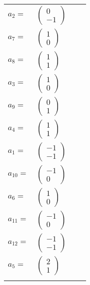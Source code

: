 \documentclass[1p]{elsarticle_modified}
\theoremstyle{definition}
\begin{document}
\begin{tabular}{m{7pt} m{180pt} m{7pt} m{180pt} }
\flushright $a_{2}=$&$\begin{pmatrix}0\\-1\end{pmatrix}$ \\
\flushright $a_{7}=$&$\begin{pmatrix}1\\0\end{pmatrix}$ \\
\flushright $a_{8}=$&$\begin{pmatrix}1\\1\end{pmatrix}$ \\
\flushright $a_{3}=$&$\begin{pmatrix}1\\0\end{pmatrix}$ \\
\flushright $a_{9}=$&$\begin{pmatrix}0\\1\end{pmatrix}$ \\
\flushright $a_{4}=$&$\begin{pmatrix}1\\1\end{pmatrix}$ \\
\flushright $a_{1}=$&$\begin{pmatrix}-1\\-1\end{pmatrix}$ \\
\flushright $a_{10}=$&$\begin{pmatrix}-1\\0\end{pmatrix}$ \\
\flushright $a_{6}=$&$\begin{pmatrix}1\\0\end{pmatrix}$ \\
\flushright $a_{11}=$&$\begin{pmatrix}-1\\0\end{pmatrix}$ \\
\flushright $a_{12}=$&$\begin{pmatrix}-1\\-1\end{pmatrix}$ \\
\flushright $a_{5}=$&$\begin{pmatrix}2\\1\end{pmatrix}$\\&\end{tabular}
\end{document}
